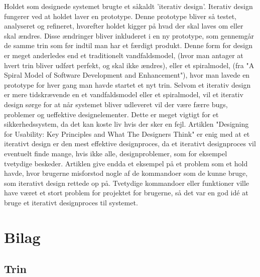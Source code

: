\documentclass[10pt,a4paper,danish]{article}
\begin{document}
Holdet som designede systemet brugte et såkaldt 'iterativ design'. Iterativ design fungerer ved at holdet 
laver en prototype. Denne prototype bliver så testet, analyseret og refineret, hvorefter holdet kigger 
på hvad der skal laves om eller skal ændres. Disse ændringer bliver inkluderet i en ny prototype, som gennemgår 
de samme trin som før indtil man har et færdigt produkt. Denne form for design er meget anderledes end et 
traditionelt vandfaldsmodel, (hvor man antager at hvert trin bliver udført perfekt, og skal ikke ændres), eller et 
spiralmodel, (fra "A Spiral Model of Software Development and Enhancement"), hvor man lavede en prototype  
for hver gang man havde startet et nyt trin. Selvom et iterativ design er mere tidskrævende en et 
vandfaldsmodel eller et spiralmodel, vil et iterativ design sørge for at når systemet bliver udleveret 
vil der være færre bugs, problemer og ueffektive designelementer. Dette er meget vigtigt for et sikkerhedssystem, 
da det kan koste liv hvis der sker en fejl. Artiklen "Designing for Usability: Key Principles and What The Designers 
Think" er enig med at et iterativt design er den mest effektive designproces, da et iterativt designproces vil eventuelt 
finde mange, hvis ikke alle, designproblemer, som for eksempel tvetydige beskeder. Artiklen give endda et eksempel 
på et problem som et hold havde, hvor brugerne misforstod nogle af de kommandoer som de kunne bruge, som iterativt design 
rettede op på. Tvetydige kommandoer eller funktioner ville have været et stort problem for projektet for brugerne, så 
det var en god idé at bruge et iterativt designproces til systemet.

\section{Bilag}
\subsection{Trin}
\end{document}
